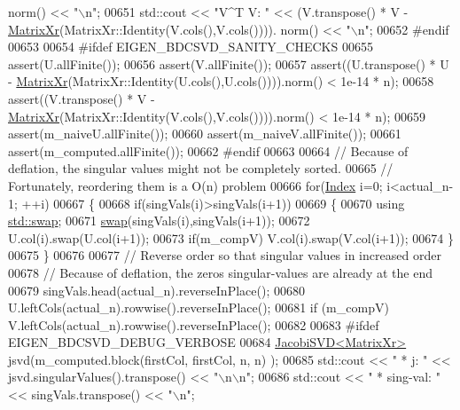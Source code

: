\begin{DoxyCode}
      norm() << \textcolor{stringliteral}{"\(\backslash\)n"};
00651   std::cout << \textcolor{stringliteral}{"V^T V: "} << (V.transpose() * V - \hyperlink{group___core___module}{MatrixXr}(MatrixXr::Identity(V.cols(),V.cols()))).
      norm() << \textcolor{stringliteral}{"\(\backslash\)n"};
00652 \textcolor{preprocessor}{#endif}
00653   
00654 \textcolor{preprocessor}{#ifdef EIGEN\_BDCSVD\_SANITY\_CHECKS}
00655   assert(U.allFinite());
00656   assert(V.allFinite());
00657   assert((U.transpose() * U - \hyperlink{group___core___module}{MatrixXr}(MatrixXr::Identity(U.cols(),U.cols()))).norm() < 1e-14 * n);
00658   assert((V.transpose() * V - \hyperlink{group___core___module}{MatrixXr}(MatrixXr::Identity(V.cols(),V.cols()))).norm() < 1e-14 * n);
00659   assert(m\_naiveU.allFinite());
00660   assert(m\_naiveV.allFinite());
00661   assert(m\_computed.allFinite());
00662 \textcolor{preprocessor}{#endif}
00663   
00664   \textcolor{comment}{// Because of deflation, the singular values might not be completely sorted.}
00665   \textcolor{comment}{// Fortunately, reordering them is a O(n) problem}
00666   \textcolor{keywordflow}{for}(\hyperlink{namespace_eigen_a62e77e0933482dafde8fe197d9a2cfde}{Index} i=0; i<actual\_n-1; ++i)
00667   \{
00668     \textcolor{keywordflow}{if}(singVals(i)>singVals(i+1))
00669     \{
00670       \textcolor{keyword}{using} \hyperlink{endian_8c_a3ca5ecd34b04d6a243c054ac3a57f68d}{std::swap};
00671       \hyperlink{endian_8c_a3ca5ecd34b04d6a243c054ac3a57f68d}{swap}(singVals(i),singVals(i+1));
00672       U.col(i).swap(U.col(i+1));
00673       \textcolor{keywordflow}{if}(m\_compV) V.col(i).swap(V.col(i+1));
00674     \}
00675   \}
00676   
00677   \textcolor{comment}{// Reverse order so that singular values in increased order}
00678   \textcolor{comment}{// Because of deflation, the zeros singular-values are already at the end}
00679   singVals.head(actual\_n).reverseInPlace();
00680   U.leftCols(actual\_n).rowwise().reverseInPlace();
00681   \textcolor{keywordflow}{if} (m\_compV) V.leftCols(actual\_n).rowwise().reverseInPlace();
00682   
00683 \textcolor{preprocessor}{#ifdef EIGEN\_BDCSVD\_DEBUG\_VERBOSE}
00684   \hyperlink{group___s_v_d___module_class_eigen_1_1_jacobi_s_v_d}{JacobiSVD<MatrixXr>} jsvd(m\_computed.block(firstCol, firstCol, n, n) );
00685   std::cout << \textcolor{stringliteral}{"  * j:        "} << jsvd.singularValues().transpose() << \textcolor{stringliteral}{"\(\backslash\)n\(\backslash\)n"};
00686   std::cout << \textcolor{stringliteral}{"  * sing-val: "} << singVals.transpose() << \textcolor{stringliteral}{"\(\backslash\)n"};

\end{DoxyCode}

